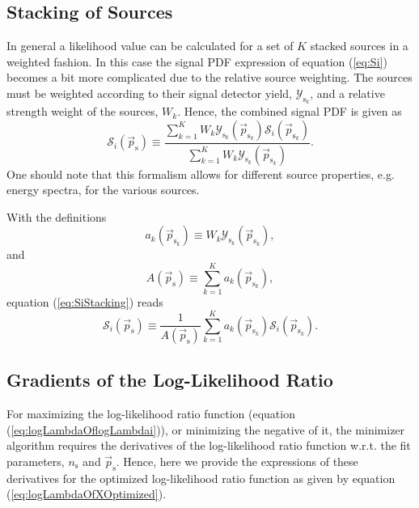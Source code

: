 \documentclass{article}
\newcommand{\ns}{n_{\mathrm{s}}}
\newcommand{\ps}{\vec{p}_{\mathrm{s}}}
\newcommand{\psk}{\vec{p}_{\mathrm{s}_k}}
\begin{document}
\subsection{Stacking of Sources}

In general a likelihood value can be calculated for a set of $K$ stacked
sources in a weighted fashion. In this case the signal PDF expression of
equation (\ref{eq:Si}) becomes a bit more complicated due to the relative
source weighting. The sources must be weighted according to their signal
detector yield, $\mathcal{Y}_{\mathrm{s}_k}$, and a relative strength weight of
the sources, $W_k$. Hence, the combined signal PDF is given as
\begin{equation}
 \mathcal{S}_i(\ps) \equiv \frac{\sum_{k=1}^{K} W_k \mathcal{Y}_{\mathrm{s}_k}(\psk) \mathcal{S}_{i}(\psk)}{\sum_{k=1}^{K}W_k\mathcal{Y}_{\mathrm{s}_k}(\psk)}.
 \label{eq:SiStacking}
\end{equation}
One should note that this formalism allows for different source properties, e.g.
energy spectra, for the various sources.

With the definitions
\begin{equation}
a_k(\psk) \equiv W_k \mathcal{Y}_{\mathrm{s}_k}(\psk),
\label{eq:SourceWeightCoefficient}
\end{equation}
and
\begin{equation}
A(\ps) \equiv \sum_{k=1}^{K} a_k(\psk),
\label{eq:SumOfSourceWeightCoefficients}
\end{equation}
equation (\ref{eq:SiStacking}) reads
\begin{equation}
\mathcal{S}_i(\ps) \equiv \frac{1}{A(\ps)} \sum_{k=1}^{K} a_k(\psk) \mathcal{S}_{i}(\psk).
\label{eq:SiStackingA}
\end{equation}


\subsection{Gradients of the Log-Likelihood Ratio}

For maximizing the log-likelihood ratio function (equation (\ref{eq:logLambdaOflogLambdai})),
or minimizing the negative of it, the minimizer algorithm requires the
derivatives of the log-likelihood ratio function w.r.t. the fit parameters,
$\ns$ and $\ps$.
Hence, here we provide the expressions of these derivatives
for the optimized log-likelihood ratio function as given by equation
(\ref{eq:logLambdaOfXOptimized}).
\end{document}

